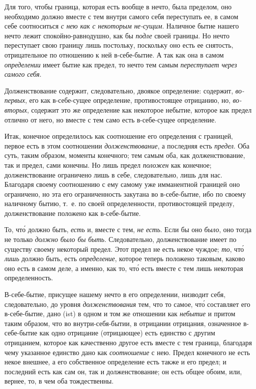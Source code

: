Для того, чтобы граница, которая есть вообще в нечто, была пределом, оно
необходимо должно вместе с тем внутри самого себя переступать ее, в самом
себе соотноситься {\em с нею как с некоторым не-сущим}.
Наличное бытие нашего нечто лежит спокойно-равнодушно, как бы
{\em подле} своей границы. Но нечто переступает свою
границу лишь постольку, поскольку оно есть ее снятость, отрицательное по
отношению к ней в-себе-бытие. А так как она в самом
{\em определении} имеет бытие как предел, то нечто тем
самым {\em переступает через самого себя}.

Долженствование содержит, следовательно, двоякое определение: содержит,
{\em во-первых}, его как в-себе-сущее определение,
противостоящее отрицанию, но, {\em во-вторых}, содержит
это же определение как некоторое небытие, которое как предел отлично от
него, но вместе с тем само есть в-себе-сущее определение.

Итак, конечное определилось как соотношение его определения с границей,
первое есть в этом соотношении {\em долженствование}, а
последняя есть {\em предел}. Оба суть, таким образом,
моменты конечного; тем самым оба, как долженствование, так и предел, сами
конечны. Но лишь предел {\em положен} как конечное;
долженствование ограничено лишь в себе, следовательно, лишь для нас.
Благодаря своему соотношению с ему самому уже имманентной границей оно
ограничено, но эта его ограниченность закутана во в-себе-бытие, ибо по
своему наличному бытию, т.~е. по своей определенности, противостоящей
пределу, долженствование положено как в-себе-бытие.

То, чт\'{о} должно быть, {\em есть} и, вместе с тем,
{\em не есть}. Если бы оно {\em было}, оно тогда не только
{\em должно было бы быть}. Следовательно,
долженствование имеет по существу своему некоторый предел. Этот предел не
есть некое чуждое; {\em то}, чт\'{о} {\em лишь} должно быть, есть
{\em определение}, которое теперь положено таковым,
каково оно есть в самом деле, а именно, как то, чт\'{о} есть вместе с тем лишь
некоторая определенность.

В-себе-бытие, присущее нашему нечто в его определении, низводит себя,
следовательно, до уровня {\em долженствования} тем, что
то самое, чт\'{о} составляет его в-себе-бытие, дано (ist) в одном и том же
отношении как {\em небытие} и притом таким образом, что
во внутри-себя-бытии, в отрицании отрицания, означенное в-себе-бытие как
одно отрицание (отрицающее) есть единство с другим отрицанием, которое как
качественно другое есть вместе с тем граница, благодаря чему указанное
единство дано как {\em соотношение} с нею. Предел
конечного не есть некое внешнее, а его собственное определение есть также и
его предел; и последний есть как сам он, так и долженствование; он есть
общее обоим, или, вернее, то, в чем оба тождественны.

